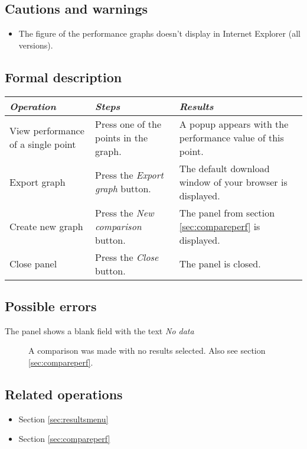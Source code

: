   \subsection*{Cautions and warnings}
  \begin{itemize}
  \item The figure of the performance graphs doesn't display in Internet Explorer (all versions).
  \end{itemize}

  \subsection*{Formal description}
    \begin{tabularx}{\textwidth}{XXX}
    \toprule
    \emph{Operation} & \emph{Steps} & \emph{Results} \\
    \midrule
    View performance of a single point & Press one of the points in the graph. & A popup appears with the performance value of this point. \\
    \midrule
    Export graph & Press the \emph{Export graph} button. & The default download window of your browser is displayed. \\
    \midrule
    Create new graph & Press the \emph{New comparison} button. & The panel from section \ref{sec:compareperf} is displayed. \\
    \midrule
    Close panel & Press the \emph{Close} button. & The panel is closed. \\
    \bottomrule
\end{tabularx}

  \subsection*{Possible errors}
  \begin{description}
  \item[The panel shows a blank field with the text \emph{No data}] A comparison was made with no results selected. Also see section \ref{sec:compareperf}.\\
  \end{description}

  \subsection*{Related operations}
   \begin{itemize}
   \item Section \ref{sec:resultsmenu}
   \item Section \ref{sec:compareperf}
  \end{itemize}

